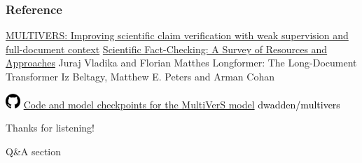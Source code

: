 \documentclass[13.5pt,aspecratio=169, xcolor=dvipsnames]{beamer}
\begin{document}
 


                

\onehalfspacing
\begin{frame} %
	\frametitle{Reference}
	
	\begin{thebibliography}{99} %
		\footnotesize %
		
			\href{https://aclanthology.org/2022.findings-naacl.6}{MULTIVERS: Improving scientific claim verification with
            weak supervision and full-document context}
        \href{https://aclanthology.org/2023.findings-acl.387.pdf}{Scientific Fact-Checking: A Survey of Resources and Approaches}
			\newblock Juraj Vladika and Florian Matthes
         Longformer: The Long-Document Transformer
        \newblock Iz Beltagy, Matthew E. Peters and Arman Cohan
		
        \hspace{-1.9em}\includegraphics[width=1.5em]{Icons/github.png}
        \textcolor{blue}{\href{https://github.com/dwadden/multivers}{Code and model checkpoints for the MultiVerS model}}
          \newblock \textcolor{black}{dwadden/multivers}
	\end{thebibliography}
\end{frame}




\begin{frame} %
	\begin{center}
		{\Huge Thanks for listening!}
		
		\bigskip\bigskip %
		
		{\LARGE Q\&A section}
	\end{center}
\end{frame}
\end{document}
